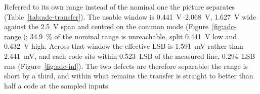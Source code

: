 Referred to its own range instead of the nominal one the picture separates
(Table~\ref{tab:adc-transfer}). The usable window is \SIrange{0.441}{2.068}{\volt},
\SI{1.627}{\volt} wide against the \SI{2.5}{\volt} span and centred on the
common mode (Figure~\ref{fig:adc-range}); \SI{34.9}{\percent} of the nominal
range is unreachable, split \SI{0.441}{\volt} low and \SI{0.432}{\volt} high.
Across that window the effective LSB is \SI{1.591}{\milli\volt} rather than
\SI{2.441}{\milli\volt}, and each code sits within \num{0.523}~LSB of the
measured line, \num{0.294}~LSB rms (Figure~\ref{fig:adc-inl}). The two defects
are therefore separable: the range is short by a third, and within what remains
the transfer is straight to better than half a code at the sampled inputs.
